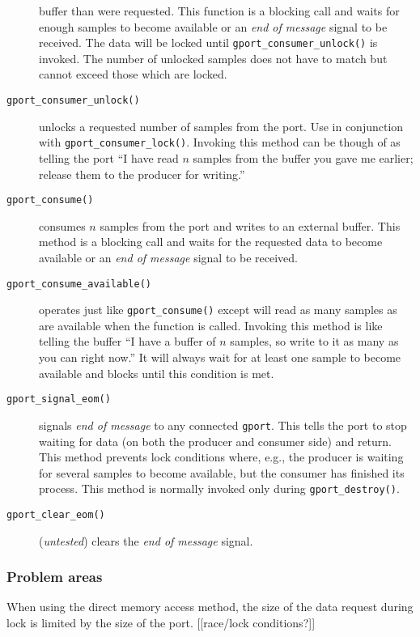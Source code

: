 \begin{description}
    buffer than were requested.
    This function is a blocking call and waits for enough samples to become
    available or an {\it end of message} signal to be received.
    The data will be locked until {\tt gport\_consumer\_unlock()} is invoked.
    The number of unlocked samples does not have to match but cannot exceed
    those which are locked.
\item[{\tt gport\_consumer\_unlock()}]
    unlocks a requested number of samples from the port.
    Use in conjunction with {\tt gport\_consumer\_lock()}.
    Invoking this method can be though of as telling the port ``I have read
    $n$ samples from the buffer you gave me earlier; release them to the
    producer for writing.''
\item[{\tt gport\_consume()}]
    consumes $n$ samples from the port and writes to an external buffer.
    This method is a blocking call and waits for the requested data to become
    available or an {\it end of message} signal to be received.
\item[{\tt gport\_consume\_available()}]
    operates just like {\tt gport\_consume()} except will read as many samples
    as are available when the function is called.
    Invoking this method is like telling the buffer ``I have a buffer of $n$
    samples, so write to it as many as you can right now.''
    It will always wait for at least one sample to become available and blocks
    until this condition is met.
\item[{\tt gport\_signal\_eom()}]
    signals {\it end of message} to any connected {\tt gport}.
    This tells the port to stop waiting for data (on both the producer and
    consumer side) and return.
    This method prevents lock conditions where, e.g., the producer is waiting
    for several samples to become available, but the consumer has finished its
    process.
    This method is normally invoked only during {\tt gport\_destroy()}.
\item[{\tt gport\_clear\_eom()}]
    ({\it untested})
    clears the {\it end of message} signal.
\end{description}


\subsubsection{Problem areas}
When using the direct memory access method, the size of the data request
during lock is limited by the size of the port.
[[race/lock conditions?]]


